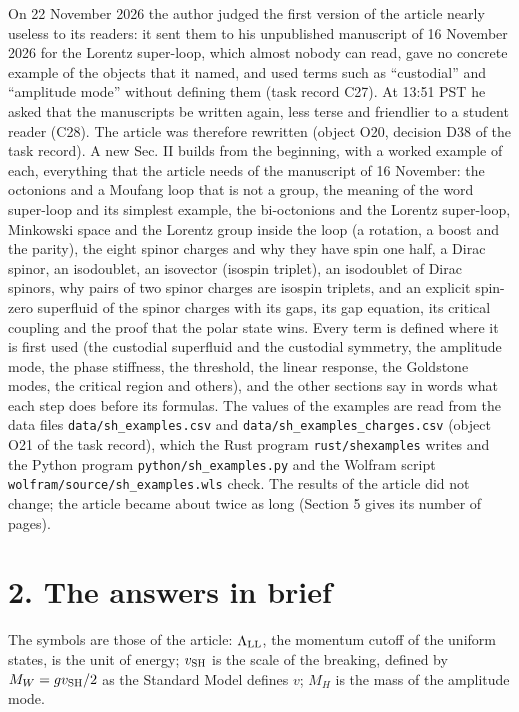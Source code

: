 \documentclass[
  10pt,
]{article}
\begin{document}
On 22 November 2026 the author judged the first version of the article
nearly useless to its readers: it sent them to his unpublished
manuscript of 16 November 2026 for the Lorentz super-loop, which almost
nobody can read, gave no concrete example of the objects that it named,
and used terms such as ``custodial'' and ``amplitude mode'' without
defining them (task record C27). At 13:51 PST he asked that the
manuscripts be written again, less terse and friendlier to a student
reader (C28). The article was therefore rewritten (object O20, decision
D38 of the task record). A new Sec. II builds from the beginning, with a
worked example of each, everything that the article needs of the
manuscript of 16 November: the octonions and a Moufang loop that is not
a group, the meaning of the word super-loop and its simplest example,
the bi-octonions and the Lorentz super-loop, Minkowski space and the
Lorentz group inside the loop (a rotation, a boost and the parity), the
eight spinor charges and why they have spin one half, a Dirac spinor, an
isodoublet, an isovector (isospin triplet), an isodoublet of Dirac
spinors, why pairs of two spinor charges are isospin triplets, and an
explicit spin-zero superfluid of the spinor charges with its gaps, its
gap equation, its critical coupling and the proof that the polar state
wins. Every term is defined where it is first used (the custodial
superfluid and the custodial symmetry, the amplitude mode, the phase
stiffness, the threshold, the linear response, the Goldstone modes, the
critical region and others), and the other sections say in words what
each step does before its formulas. The values of the examples are read
from the data files \texttt{data/sh\_examples.csv} and
\texttt{data/sh\_examples\_charges.csv} (object O21 of the task record),
which the Rust program \texttt{rust/shexamples} writes and the Python
program \texttt{python/sh\_examples.py} and the Wolfram script
\texttt{wolfram/source/sh\_examples.wls} check. The results of the
article did not change; the article became about twice as long (Section
5 gives its number of pages).

\hypertarget{the-answers-in-brief}{%
\section{2. The answers in brief}\label{the-answers-in-brief}}

The symbols are those of the article: \(\Lambda_{\rm LL}\), the momentum
cutoff of the uniform states, is the unit of energy; \(v_{\rm SH}\) is
the scale of the breaking, defined by \(M_W=gv_{\rm SH}/2\) as the
Standard Model defines \(v\); \(M_H\) is the mass of the amplitude mode.
\end{document}
